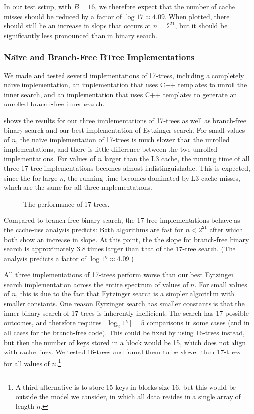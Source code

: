 \documentclass{patmorin}
\begin{document}
In our test setup, with $B=16$, we therefore expect that the number
of cache misses should be reduced by a factor of $\log 17\approx
4.09$. When plotted, there should still be an increase in slope that
occurs at $n=2^{21}$, but it should be significantly less pronounced
than in binary search.

\subsubsection{Na\"{\i}ve and Branch-Free BTree Implementations}

We made and tested several implementations of 17-trees, including a
completely na\"{\i}ve implementation, an implementation that uses C++
templates to unroll the inner search, and an implementation that uses C++
templates to generate an unrolled branch-free inner search.

 shows the results for our three implementations of
17-trees as well as branch-free binary search and our best implementation
of Eytzinger search.  For small values of $n$, the na\"ive implementation
of 17-trees is much slower than the unrolled implementations, and there
is little difference between the two unrolled implementations. For values
of $n$ larger than the L3 cache, the running time of all three 17-tree
implementations becomes almost indistinguishable. This is expected,
since the for large $n$, the running-time becomes dominated by L3 cache
misses, which are the same for all three implementations.

\begin{figure}
   \caption{The performance of 17-trees.}
\end{figure}


Compared to branch-free binary search, the 17-tree implementations
behave as the cache-use analysis predicts:  Both algorithms are fast for
$n<2^{21}$ after which both show an increase in slope. At this point,
the the slope for branch-free binary search is approximately 3.8 times
larger than that of the 17-tree search. (The analysis predicts a factor
of $\log 17\approx 4.09$.)

All three implementations of 17-trees perform worse than our best
Eytzinger search implementation across the entire spectrum of values
of $n$.  For small values of $n$, this is due to the fact that Eytzinger
search is a simpler algorithm with smaller constants.  One reason
Eytzinger search has smaller constants is that the inner binary search of
17-trees is inherently inefficient. The search has 17 possible outcomes,
and therefore requires $\lceil\log_2 17\rceil=5$ comparisons in some cases
(and in all cases for the branch-free code).  This could be fixed by using
16-trees instead, but then the number of keys stored in a block would
be 15, which does not align with cache lines.  We tested 16-trees and
found them to be slower than 17-trees for all values of $n$.\footnote{A
third alternative is to store 15 keys in blocks size 16, but this would
be outside the model we consider, in which all data resides in a single
array of length $n$.}
\end{document}
